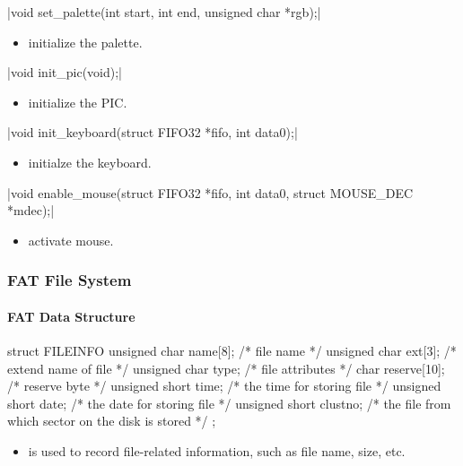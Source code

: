 \documentclass{swfcthesis}
\begin{document}
\csingle|void set_palette(int start, int end, unsigned char *rgb);|
\begin{itemize}
\item initialize the palette.
\end{itemize}

\csingle|void init_pic(void);|
\begin{itemize}
\item initialize the PIC.
\end{itemize}

\csingle|void init_keyboard(struct FIFO32 *fifo, int data0);|
\begin{itemize}
\item initialze the keyboard.
\end{itemize}

\csingle|void enable_mouse(struct FIFO32 *fifo, int data0, struct MOUSE_DEC *mdec);|
\begin{itemize}
\item activate mouse.
\end{itemize}

\subsubsection{FAT File System}
\label{sec:fat}

  
\paragraph{FAT Data Structure}

\begin{codeblock}[1]
\begin{ccode}
struct FILEINFO
{ 
  unsigned char name[8];   /* file name */
  unsigned char ext[3];    /* extend name of file */
  unsigned char type;      /* file attributes */
  char reserve[10];        /* reserve byte */
  unsigned short time;     /* the time for storing file */
  unsigned short date;     /* the date for storing file */
  unsigned short  clustno; /* the file from which sector on the disk is stored */
};
\end{ccode}
\end{codeblock}
\begin{itemize}
\item is used to record file-related information, such as file name, size, etc.
\end{itemize}
\end{document}

